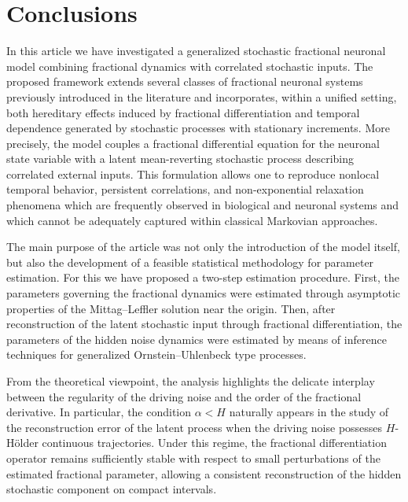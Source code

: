 \documentclass[11pt,reqno,oneside, a4paper]{amsart}
\numberwithin{equation}{section}
\theoremstyle{remark}
\begin{document}
\section{Conclusions}
\label{sec:conclusions}

In this article we have investigated a generalized stochastic fractional neuronal model
combining fractional dynamics with correlated stochastic inputs. The proposed framework
extends several classes of fractional neuronal systems previously introduced in the
literature and incorporates, within a unified setting, both hereditary effects induced
by fractional differentiation and temporal dependence generated by stochastic processes
with stationary increments.
More precisely, the model couples a fractional differential equation for the neuronal
state variable with a latent mean-reverting stochastic process describing correlated
external inputs. This formulation allows one to reproduce nonlocal temporal behavior,
persistent correlations, and non-exponential relaxation phenomena which are frequently
observed in biological and neuronal systems and which cannot be adequately captured
within classical Markovian approaches.

The main purpose of the article was not only the introduction of the model itself,
but also the development of a feasible statistical methodology for parameter estimation. For this we have proposed a two-step estimation
procedure. First, the parameters governing the fractional dynamics were estimated
through asymptotic properties of the Mittag--Leffler solution near the origin. Then,
after reconstruction of the latent stochastic input through fractional differentiation,
the parameters of the hidden noise dynamics were estimated by means of inference
techniques for generalized Ornstein--Uhlenbeck type processes.

From the theoretical viewpoint, the analysis highlights the delicate interplay between
the regularity of the driving noise and the order of the fractional derivative. In
particular, the condition
$\alpha < H$
naturally appears in the study of the reconstruction error of the latent process when
the driving noise possesses $H$-H\"older continuous trajectories. Under this regime,
the fractional differentiation operator remains sufficiently stable with respect to
small perturbations of the estimated fractional parameter, allowing a consistent
reconstruction of the hidden stochastic component on compact intervals.
\end{document}
